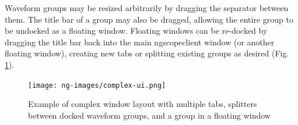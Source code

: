 Waveform groups may be resized arbitrarily by dragging the separator between them. The title bar of a group may also be
dragged, allowing the entire group to be undocked as a floating window. Floating windows can be re-docked by dragging
the title bar back into the main ngscopeclient window (or another floating window), creating new tabs or splitting
existing groups as desired (Fig. \ref{complex-ui}).

\begin{figure}[h]
\centering
\texttt{[image: ng-images/complex-ui.png]}
\caption{Example of complex window layout with multiple tabs, splitters between docked waveform groups, and a group in
a floating window}
\label{complex-ui}
\end{figure}
